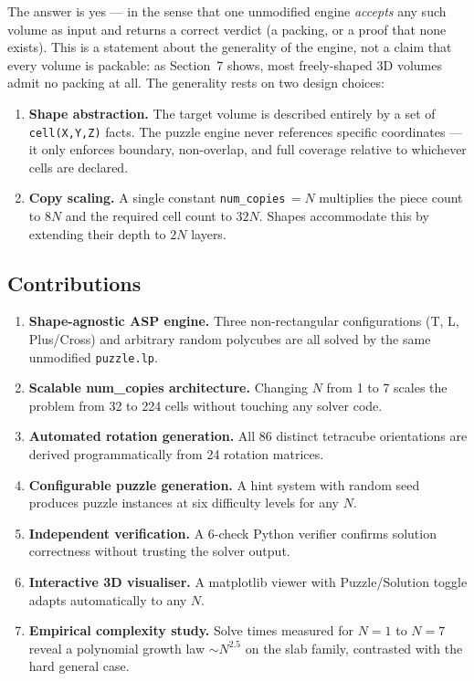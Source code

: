 \documentclass[a4paper,UKenglish,cleveref,autoref]{lipics-v2021}
\begin{document}
The answer is yes --- in the sense that one unmodified engine \emph{accepts}
any such volume as input and returns a correct verdict (a packing, or a proof
that none exists).  This is a statement about the generality of the engine, not
a claim that every volume is packable: as Section~7 shows, most freely-shaped
3D volumes admit no packing at all.  The generality rests on two design choices:
\begin{enumerate}
  \item \textbf{Shape abstraction.}  The target volume is described entirely
        by a set of \texttt{cell(X,Y,Z)} facts.  The puzzle engine never
        references specific coordinates --- it only enforces boundary, non-overlap,
        and full coverage relative to whichever cells are declared.
  \item \textbf{Copy scaling.}  A single constant \texttt{num\_copies}\,$=N$
        multiplies the piece count to $8N$ and the required cell count to $32N$.
        Shapes accommodate this by extending their depth to $2N$ layers.
\end{enumerate}

\subsection{Contributions}

\begin{enumerate}[\bfseries C1.]
  \item \textbf{Shape-agnostic ASP engine.}  Three non-rectangular
        configurations (T, L, Plus/Cross) and arbitrary random polycubes
        are all solved by the same unmodified \texttt{puzzle.lp}.
  \item \textbf{Scalable num\_copies architecture.}  Changing $N$ from 1 to 7
        scales the problem from 32 to 224 cells without touching any solver code.
  \item \textbf{Automated rotation generation.}  All 86 distinct tetracube
        orientations are derived programmatically from 24 rotation matrices.
  \item \textbf{Configurable puzzle generation.}  A hint system with random
        seed produces puzzle instances at six difficulty levels for any $N$.
  \item \textbf{Independent verification.}  A 6-check Python verifier
        confirms solution correctness without trusting the solver output.
  \item \textbf{Interactive 3D visualiser.}  A matplotlib viewer with
        Puzzle/Solution toggle adapts automatically to any $N$.
  \item \textbf{Empirical complexity study.}  Solve times measured for
        $N=1$ to $N=7$ reveal a polynomial growth law $\sim N^{2.5}$ on the
        slab family, contrasted with the hard general case.
\end{enumerate}
\end{document}
